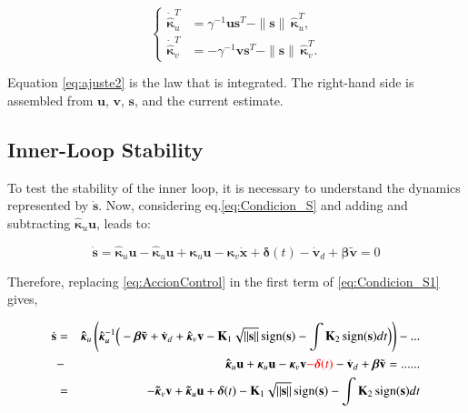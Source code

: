 \documentclass[sn-mathphys-num]{sn-jnl}
\DeclareMathOperator{\sign}{sign}
\theoremstyle{thmstyleone}%
\theoremstyle{thmstyletwo}%
\theoremstyle{thmstylethree}%
\begin{document}
\begin{equation}\label{eq:ajuste2}
\left\{
\begin{aligned}
\dot{\hat{\boldsymbol{\kappa}}}_u^{T} &= \gamma^{-1}\mathbf{u}\mathbf{s}^{T} - \|\mathbf{s}\|\,\hat{\boldsymbol{\kappa}}_u^{T},\\
\dot{\hat{\boldsymbol{\kappa}}}_v^{T} &= -\gamma^{-1}\mathbf{v}\mathbf{s}^{T} - \|\mathbf{s}\|\,\hat{\boldsymbol{\kappa}}_v^{T}.
\end{aligned}
\right.
\end{equation}

Equation \eqref{eq:ajuste2} is the law that is integrated. The right-hand side is assembled from \(\mathbf{u}\), \(\mathbf{v}\), \(\mathbf{s}\), and the current estimate.

\subsection{Inner-Loop Stability}\label{sec:inner_stability}

To test the stability of the inner loop, it is necessary to understand the dynamics represented by $\dot{\mathbf{s}}$.
Now, considering eq.\eqref{eq:Condicion_S} and adding and subtracting $\boldsymbol{\hat{\kappa}}_u\mathbf{u}$, leads to: 

\begin{equation}\label{eq:Condicion_S1}
    \dot{\mathbf{s}} =\boldsymbol{\hat{\kappa}}_u\mathbf{u}-\boldsymbol{\hat{\kappa}}_u\mathbf{u} +\boldsymbol{\kappa}_u\mathbf{u} - \boldsymbol{\kappa}_v\dot{\mathbf{x}}+\boldsymbol{\delta}(t) - 
    \dot{\mathbf{v}}_d + \boldsymbol{\beta} \tilde{\mathbf{v}} = 0
\end{equation}

Therefore, replacing \eqref{eq:AccionControl} in the first term of \eqref{eq:Condicion_S1} gives,

\begin{eqnarray}\label{eq:dynamical_equation}
  \nonumber\dot{\mathbf{s}} &=& \boldsymbol{\hat{\kappa}}_u\left(\hat{\boldsymbol{\kappa}}_u^{-1}\Big( -\boldsymbol{\beta} \tilde{\mathbf{v}} + \dot{\mathbf{v}}_d + \hat{\boldsymbol{\kappa}}_v \mathbf{v} - \mathbf{K}_1\sqrt{||\mathbf{s}||}\sign(\mathbf{s}) - \int \mathbf{K}_2\sign(\mathbf{s}) dt\Big) \right) -...\\
   \nonumber &-&\boldsymbol{\hat{\kappa}}_u\mathbf{u} +\boldsymbol{\kappa}_u\mathbf{u}- \boldsymbol{\kappa}_v\mathbf{v} \textcolor{red}{- \boldsymbol{\delta}(t)}  - 
    \dot{\mathbf{v}}_d + \boldsymbol{\beta} \tilde{\mathbf{v}}=......\\
    &=&-\boldsymbol{\tilde{\kappa}}_v\mathbf{v}+\boldsymbol{\tilde{\kappa}}_u\mathbf{u}+\boldsymbol{\delta}(t)- \mathbf{K}_1\sqrt{||\mathbf{s}||}\sign(\mathbf{s}) - \int \mathbf{K}_2\sign(\mathbf{s}) dt
\end{eqnarray}
\end{document}
